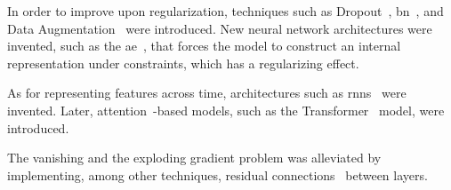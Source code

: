 \par
In order to improve upon regularization, techniques such as Dropout~\cite{dropout}, \gls*{bn}~\cite{batchnorm}, and Data Augmentation~\cite{data_augmentation} were introduced. New neural network architectures were invented, such as the \gls*{ae}~\cite{autoencoder}, that forces the model to construct an internal representation under constraints, which has a regularizing effect.
\par
As for representing features across time, architectures such as \glspl*{rnn}~\cite{lstm,gru} were invented. Later, attention~\cite{attention}-based models, such as the Transformer~\cite{transformer} model, were introduced.\par
The vanishing and the exploding gradient problem was alleviated by implementing, among other techniques, residual connections~\cite{resnet} between layers.
